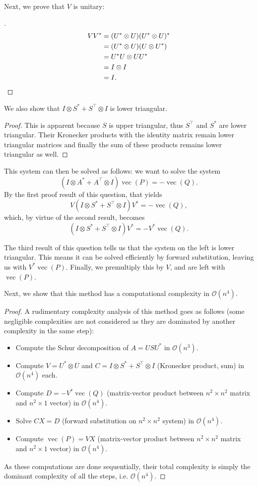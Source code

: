 \documentclass[11pt]{article}
\newcommand{\kp}{\otimes}
\DeclareMathOperator{\vect}{vec}
\newcommand{\bo}{\mathcal{O}}
\begin{document}
Next, we prove that \(V\) is unitary:
\begin{proof}[\leavevmode]
\begin{align*}
   V V^{*} &= (U^{*} \kp U) (U^{*} \kp U)^{*} \\
   &= (U^{*} \kp U) (U \kp U^{*}) \\
   &= U^{*} U \kp U U^{*} \\
   &= I \kp I \\
   &= I.\qedhere
\end{align*}
\end{proof}

We also show that $I \kp S^{*} + S^\top \kp I$ is lower triangular.
\begin{proof}
	This is apparent because \(S\) is upper triangular, thus $S^\top$ and $S^{*}$ are lower triangular.
	Their Kronecker products with the identity matrix remain lower triangular matrices and finally the sum of these products remains lower triangular as well.
\end{proof}

This system can then be solved as follows: we want to solve the system
\[
(I \kp A^* + A^\top \kp I) \vect(P) = -\vect(Q).
\]
By the first proof result of this question, that yields
\[
V (I \kp S^* + S^\top \kp I) V^* = -\vect(Q),
\]
which, by virtue of the second result, becomes
\[
(I \kp S^* + S^\top \kp I) V^* = - V^*\vect(Q).
\]

The third result of this question tells us that the system on the left is lower triangular.
This means it can be solved efficiently by forward substitution, leaving us with \(V^* \vect(P)\).
Finally, we premultiply this by \(V\), and are left with \(\vect(P)\).

Next, we show that this method has a computational complexity in \(\bo(n^4)\).
\begin{proof}
A rudimentary complexity analysis of this method goes as follows (some negligible complexities are not considered as they are dominated by another complexity in the same step):
\begin{itemize}
	\item Compute the Schur decomposition of \(A = U S U^*\) in \(\bo(n^3)\).
	\item Compute \(V = U^* \kp U\) and \(C = I \kp S^* + S^\top \kp I\) (Kronecker product, sum) in \(\bo(n^4)\) each.
	\item Compute \(D = -V^* \vect(Q)\) (matrix-vector product between \(n^2 \times n^2\) matrix and \(n^2 \times 1\) vector) in \(\bo(n^4)\).
	\item Solve \(C X = D\) (forward substitution on \(n^2 \times n^2\) system) in \(\bo(n^4)\).
	\item Compute \(\vect(P) = VX\) (matrix-vector product between \(n^2 \times n^2\) matrix and \(n^2 \times 1\) vector) in \(\bo(n^4)\).
\end{itemize}
As these computations are done sequentially, their total complexity is simply the dominant complexity of all the steps, i.e. \(\bo(n^4)\).
\end{proof}
\end{document}
